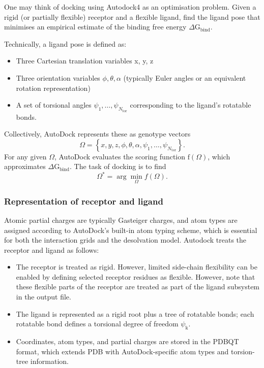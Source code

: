 \documentclass[12pt]{article}
\begin{document}
One may think of docking using Autodock4 as an optimisation problem. Given a rigid (or partially flexible) receptor and a flexible ligand, find the ligand pose that minimises an empirical estimate of the binding free energy $\Delta \textrm{G}_{\textrm{bind}}$.

Technically, a ligand pose is defined as:
\begin{itemize}
  \item Three Cartesian translation variables x, y, z
  \item Three orientation variables $ \phi, \theta, \alpha $ (typically Euler angles or an equivalent rotation representation)
  \item A set of torsional angles $ \psi_1, \dots, \psi_{N_{\textrm{tor}}}$ corresponding to the ligand's rotatable bonds.
\end{itemize}

Collectively, AutoDock represents these as genotype vectors
\begin{equation}
  \Omega = \left\{ x, y, z, \phi, \theta, \alpha, \psi_1, \dots, \psi_{N_{\text{tor}}} \right\}.
\end{equation}
For any given $\Omega$, AutoDock evaluates the scoring function $\textrm{f}(\Omega)$, which approximates $\Delta$$\textrm{G}_\textrm{bind}$. The task of docking is to find
\begin{equation}
  \Omega^{\ast} = \arg\min_{\Omega} f(\Omega).
\end{equation}

\subsubsection{Representation of receptor and ligand}
Atomic partial charges are typically Gasteiger charges, and atom types are assigned according to AutoDock's built-in atom typing scheme, which is essential for both the interaction grids and the desolvation model\cite{CH7_Huey2007}. 
Autodock treats the receptor and ligand as follows:
\begin{itemize}
  \item The receptor is treated as rigid. However, limited side-chain flexibility can be enabled by defining selected receptor residues as flexible. However, note that these flexible parts of the receptor are treated as part of the ligand subsystem in the output file.
  \item The ligand is represented as a rigid root plus a tree of rotatable bonds; each rotatable bond defines a torsional degree of freedom $\psi_\textrm{k}$.
  \item Coordinates, atom types, and partial charges are stored in the PDBQT format, which extends PDB with AutoDock-specific atom types and torsion-tree information.
\end{itemize}
\end{document}
